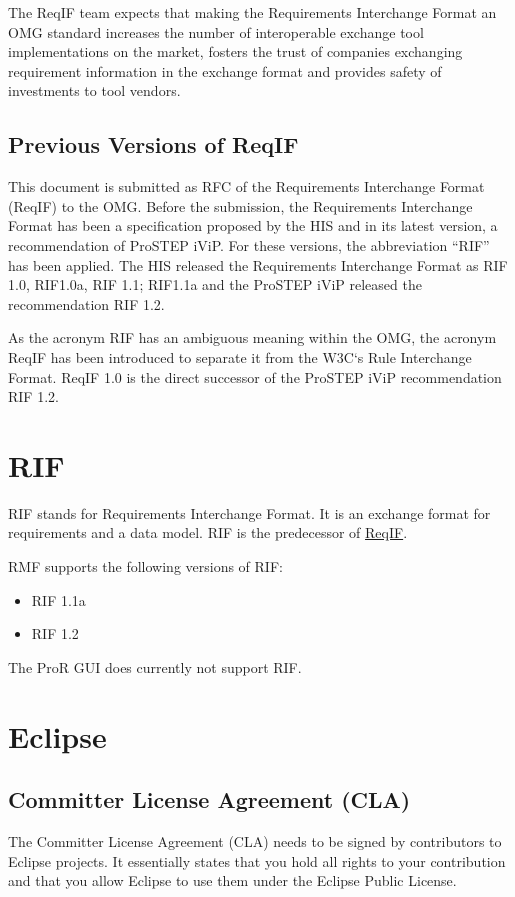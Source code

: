The ReqIF team expects that making the Requirements Interchange Format an OMG standard increases the number of interoperable exchange tool implementations on the market, fosters the trust of companies exchanging requirement information in the exchange format and provides safety of investments to tool vendors.

\subsection{Previous Versions of ReqIF}

This document is submitted as RFC of the Requirements Interchange Format (ReqIF) to the OMG.  Before the submission, the Requirements Interchange Format has been a specification proposed by the HIS and in its latest version, a recommendation of ProSTEP iViP.  For these versions, the abbreviation ``RIF'' has been applied.  The HIS released the Requirements Interchange Format as RIF 1.0, RIF1.0a, RIF 1.1; RIF1.1a and the ProSTEP iViP released the recommendation RIF 1.2.

As the acronym RIF has an ambiguous meaning within the OMG, the acronym ReqIF has been introduced to separate it from the W3C`s Rule Interchange Format.  ReqIF 1.0 is the direct successor of the ProSTEP iViP recommendation RIF 1.2.

\section{RIF}

RIF stands for Requirements Interchange Format.  It is an exchange format for requirements and a data model.  RIF is the predecessor of \href{RMF/ReqIF}{ReqIF}.

RMF supports the following versions of RIF:

\begin{itemize}
\item RIF 1.1a
\item RIF 1.2
\end{itemize}

The ProR GUI does currently not support RIF.

\section{Eclipse}

\subsection{Committer License Agreement (CLA)}

The Committer License Agreement (CLA) needs to be signed by contributors to Eclipse projects.  It essentially states that you hold all rights to your contribution and that you allow Eclipse to use them under the Eclipse Public License.


